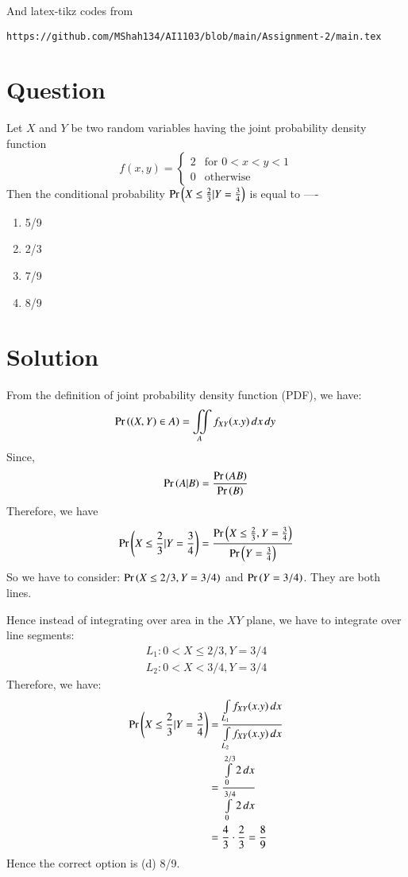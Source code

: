 \documentclass[journal,12pt,twocolumn]{IEEEtran}
\begin{document}
And latex-tikz codes from 
\begin{lstlisting}
https://github.com/MShah134/AI1103/blob/main/Assignment-2/main.tex
\end{lstlisting}

\section*{Question}
Let $X$ and $Y$ be two random variables having the joint probability density function
\[
    f(x,y) = \begin{cases}
        2 & \text{for } 0 < x < y < 1\\
        0 & \text{otherwise}
        \end{cases} 
  \] 
Then the conditional probability $\Pr\left(X\leq \frac{2}{3}|Y = \frac{3}{4}\right)$ is equal to ----
\begin{enumerate}
    \item 5/9
    \item 2/3
    \item 7/9
    \item 8/9
\end{enumerate}
\section*{Solution}
From the definition of joint probability density function (PDF), we have:
\begin{align}
\Pr\left((X,Y)\in A\right) = 
\iint\limits_A f_{XY}(x.y)\,dx\,dy\qquad
\end{align}
Since,
\begin{align}
\Pr\left(A|B\right)=\frac{\Pr\left(AB\right)}{\Pr\left(B\right)}    
\end{align}
Therefore, we have 
\begin{align}
\Pr\left(X\leq \frac{2}{3}|Y = \frac{3}{4}\right) = \frac{\Pr\left(X\leq \frac{2}{3}, Y = \frac{3}{4}\right)}{\Pr\left(Y = \frac{3}{4}\right)}  
\end{align}
So we have to consider: $\Pr\left(X \leq 2/3, Y = 3/4\right)$ and $\Pr\left(Y = 3/4\right)$. They are both lines. 

Hence instead of integrating over area in the $XY$ plane, we have to integrate over line segments:
\begin{align}
L_1 : 0 < X \leq 2/3, Y = 3/4 \\
L_2 : 0 < X < 3/4, Y = 3/4  
\end{align}
Therefore, we have:
\begin{align}
\Pr\left(X\leq \frac{2}{3}|Y = \frac{3}{4}\right) &= \frac{\int\limits_{L_1} f_{XY}(x.y)\,dx}{\int\limits_{L_2} f_{XY}(x.y)\,dx}  \\
&= \frac{\int\limits_{0}^{2/3} 2\,dx}{\int\limits_{0}^{3/4} 2\,dx} \\
&= \frac{4}{3} \cdot \frac{2}{3} = \frac{8}{9}
\end{align}
Hence the correct option is (d) 8/9.
\end{document}
